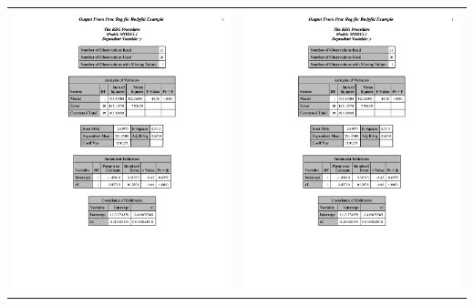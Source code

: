 \documentclass{article}
\begin{document}
\begin{center}
\begin{tabular}{cc}
\includegraphics[page=3,scale=0.5,trim=40mm 30mm 20mm 10mm]{bodyfatexample}&
\includegraphics[page=4,scale=0.5,trim=40mm 30mm 20mm 10mm]{bodyfatexample}\\

\end{tabular}
\end{center}
\end{document}
